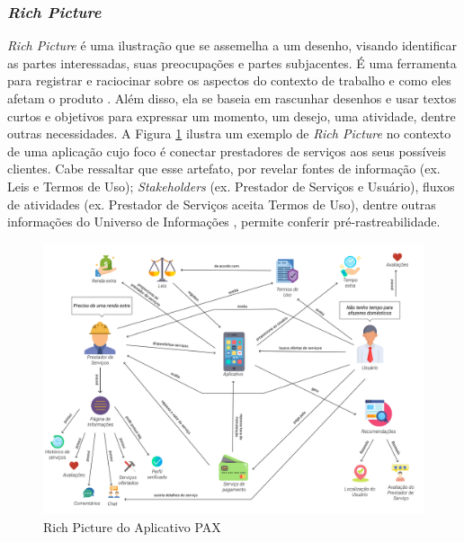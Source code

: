 \subsubsection{\textit{Rich Picture}}

\label{sec:rich_picture}

\textit{Rich Picture} é uma ilustração que se assemelha a um desenho, visando identificar as partes interessadas, suas preocupações e partes subjacentes. É uma ferramenta para registrar e raciocinar sobre os aspectos do contexto de trabalho e como eles afetam o produto  \cite{10.1145/274430.274434}. Além disso, ela se baseia em rascunhar desenhos e usar textos curtos e objetivos para expressar um momento, um desejo, uma atividade, dentre outras necessidades. A Figura \ref{fig:rich_picture} ilustra um exemplo de \textit{Rich Picture} no contexto de uma aplicação cujo foco é conectar prestadores de serviços aos seus possíveis clientes. Cabe ressaltar que esse artefato, por revelar fontes de informação (ex. Leis e Termos de Uso); \textit{Stakeholders} (ex. Prestador de Serviços e Usuário), fluxos de atividades (ex. Prestador de Serviços aceita Termos de Uso), dentre outras informações do Universo de Informações \cite{leite2007livro}, permite conferir pré-rastreabilidade.

\begin{figure}[H]
    \begin{center}
        \caption{Rich Picture do Aplicativo PAX}
        \label{fig:rich_picture}
        \includegraphics[scale=0.25]{figuras/Embasamento/rp_geral_v2.png}
    \end{center}
\end{figure}

